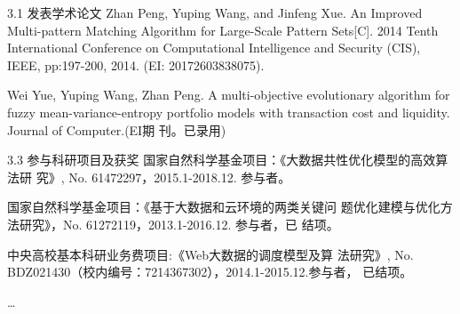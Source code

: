 \begin{resume}
\begin{resumelist}{\hspace{-0.25em}3.1\hspace{0.5em} 发表学术论文}
  \resumelistitem Zhan Peng, Yuping Wang, and Jinfeng Xue. An Improved
  Multi-pattern Matching Algorithm for Large-Scale Pattern
  Sets[C]. 2014 Tenth International Conference on Computational
  Intelligence and Security (CIS), IEEE, pp:197-200, 2014. (EI:
  20172603838075).

  \resumelistitem Wei Yue, Yuping Wang, Zhan Peng. A multi-objective
  evolutionary algorithm for fuzzy mean-variance-entropy portfolio
  models with transaction cost and liquidity. Journal of Computer.(EI期
  刊。已录用)
\end{resumelist}

\begin{resumelist}{\hspace{-0.25em}3.3\hspace{0.5em} 参与科研项目及获奖}
  \resumelistitem 国家自然科学基金项目：《大数据共性优化模型的高效算法研
  究》, No. 61472297，2015.1-2018.12. 参与者。


  \resumelistitem 国家自然科学基金项目：《基于大数据和云环境的两类关键问
  题优化建模与优化方法研究》，No. 61272119，2013.1-2016.12. 参与者，已
  结项。

  \resumelistitem 中央高校基本科研业务费项目:《Web大数据的调度模型及算
  法研究》, No. BDZ021430（校内编号：7214367302），2014.1-2015.12.参与者，
  已结项。

\resumelistitem \ldots
\end{resumelist}
\end{resume}
